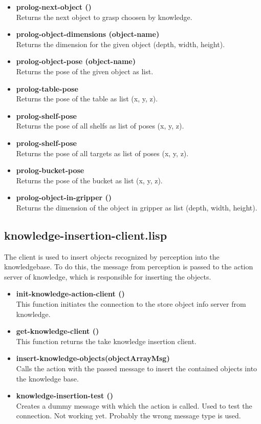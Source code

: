 \documentclass[main.tex]{subfiles}
\begin{document}
\begin{itemize}
				\item \textbf{prolog-next-object ()} \\ Returns the next object to grasp choosen by knowledge.
		    \item \textbf{prolog-object-dimensions (object-name)} \\ Returns the dimension for the given object (depth, width, height).
				\item \textbf{prolog-object-pose (object-name)} \\ Returns the pose of the given object as list.
				\item \textbf{prolog-table-pose} \\ Returns the pose of the table as list (x, y, z).
				\item \textbf{prolog-shelf-pose} \\ Returns the pose of all shelfs as list of poses (x, y, z).
				\item \textbf{prolog-shelf-pose} \\ Returns the pose of all targets as list of poses (x, y, z).
				\item \textbf{prolog-bucket-pose} \\ Returns the pose of the bucket as list (x, y, z).
				\item \textbf{prolog-object-in-gripper ()} \\ Returns the dimension of the object in gripper as list (depth, width, height).
			\end{itemize} 
		\subsection{knowledge-insertion-client.lisp}
		\label{knowledge-insertion}
		The client is used to insert objects recognized by perception into the knowledgebase. To do this, the message from perception is passed to the action server of knowledge, which is responsible for inserting the objects.
		\begin{itemize}
		  \item \textbf{init-knowledge-action-client ()} \\
		  This function initiates the connection to the store object info server from knowledge.
		  \item \textbf{get-knowledge-client ()}  \\
		  This function returns the take knowledge insertion client.
		  \item \textbf{insert-knowledge-objects(objectArrayMsg)} \\
		  Calls the action with the passed message to insert the contained objects into the knowledge base.
		  \item \textbf{knowledge-insertion-test ()} \\
		  Creates a dummy message with which the action is called. Used to test the connection. Not working yet. Probably the wrong message type is used.
		\end{itemize}
\end{document}
